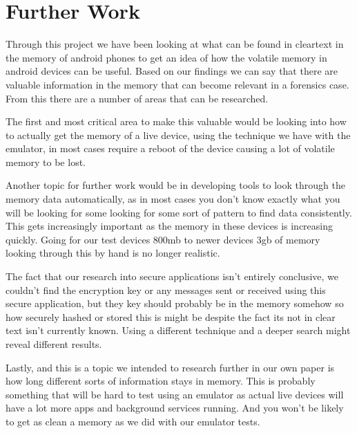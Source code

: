 \section{Further Work}
Through this project we have been looking at what can be found in cleartext in the memory of android phones to get an idea of how the volatile memory in android devices  can be useful. Based on our findings we can say that there are valuable information in the memory that can become relevant in a forensics case. From this there are a number of areas that can be researched.

The first and most critical area to make this valuable would be looking into how to actually get the memory of a live device, using the technique we have with the emulator, in most cases require a reboot of the device causing a lot of volatile memory to be lost.

Another topic for further work would be in developing tools to look through the memory data automatically, as in most cases you don't know exactly what you will be looking for some looking for some sort of pattern to find data consistently. This gets increasingly important as the memory in these devices is increasing quickly. Going for our test devices 800mb to newer devices 3gb of memory looking through this by hand is no longer realistic.

The fact that our research into secure applications isn't entirely conclusive, we couldn't find the encryption  key or any messages sent or received using this secure application, but they key should probably be in the memory somehow so how securely hashed or stored this is might be despite the fact its not in clear text isn't currently known. Using a different technique and a deeper search might reveal different results.  

Lastly, and this is a topic we intended to research further in our own paper is how long different sorts of information stays in memory. This is probably something that will be hard to test using an emulator as actual live devices will have a lot more apps and background services running. And you won't be likely to get as clean a memory as we did with our emulator tests. 